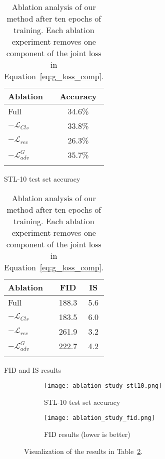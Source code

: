 \documentclass[a4paper,12pt]{report}
\begin{document}
\begin{table}[ht!]
    \begin{subtable}{.5\linewidth}
      \centering
        \begin{tabular}{l c}
        \Xhline{0.8pt}
        \textbf{Ablation} & \textbf{Accuracy} \\
        \hline
        Full & 34.6\% \\ %
        $-\mathcal{L}_{Cls}$ & 33.8\% \\ %
        $-\mathcal{L}_{rec}$ & 26.3\% \\ %
        $-\mathcal{L}^G_{adv}$ & 35.7\% \\ %
        \Xhline{0.8pt}
        \end{tabular}
        \caption{STL-10 test set accuracy}
    \end{subtable}%
    \begin{subtable}{.5\linewidth}
      \centering
        \begin{tabular}{l c c}
        \Xhline{0.8pt}
        \textbf{Ablation} & \textbf{FID} & \textbf{IS} \\
        \hline
        Full & 188.3 & 5.6\\ %
        $-\mathcal{L}_{Cls}$ & 183.5 & 6.0\\ %
        $-\mathcal{L}_{rec}$ & 261.9 & 3.2\\ %
        $-\mathcal{L}^G_{adv}$ & 222.7 & 4.2\\ %
        \Xhline{0.8pt}
        \end{tabular}
        \caption{FID and IS results}
    \end{subtable} 
    \caption[Ablation analysis of our method.]{Ablation analysis of our method after ten epochs of training. Each ablation experiment removes one component of the joint loss in Equation~\ref{eq:g_loss_comp}.}
    \label{tab:ablation_stL10_fid}
\end{table}

\begin{figure}[h]
\centering
\begin{subfigure}{0.49\textwidth}
\texttt{[image: ablation\_study\_stl10.png]}
\caption{STL-10 test set accuracy}
\label{fig:ablation_stl10}
\end{subfigure}
\begin{subfigure}{0.49\textwidth}
\texttt{[image: ablation\_study\_fid.png]}
\caption{FID results (lower is better)}
\label{fig:ablation_fid}
\end{subfigure}
\caption[Visualization of ablation analysis.]{Visualization of the results in Table~\ref{tab:ablation_stL10_fid}.}
\label{fig:ablation_stl10_fid}
\end{figure}
\end{document}
